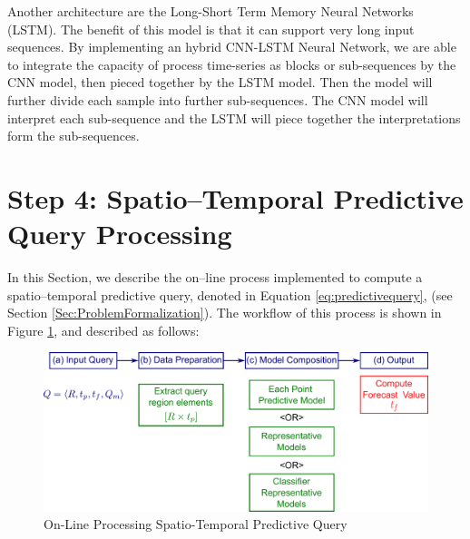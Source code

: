 Another architecture are the Long-Short Term Memory Neural Networks (LSTM). The benefit of this model is that it can support very long input sequences. By implementing an hybrid CNN-LSTM Neural Network, we are able to integrate the capacity of process time-series as blocks or sub-sequences by the CNN model, then pieced together by the LSTM model. Then the model will further divide each sample into further sub-sequences. The CNN model will interpret each sub-sequence and the LSTM will piece together the interpretations form the sub-sequences. 



\section{Step 4: Spatio--Temporal Predictive Query Processing}
\label{Sec:SpatioTemporalQueryProcessing}	

In this Section, we describe the on--line process implemented to compute a spatio--temporal predictive query, denoted in Equation \ref{eq:predictivequery}, (see Section \ref{Sec:ProblemFormalization}). The workflow of this process is shown in Figure \ref{Fig:OnLineQP}, and described as follows: 

\begin{figure}[h]
	\centering
	\includegraphics[scale=0.35]{../Figures/Query_Processing}
	\caption{On-Line Processing Spatio-Temporal Predictive Query}
	\label{Fig:OnLineQP}
\end{figure}

